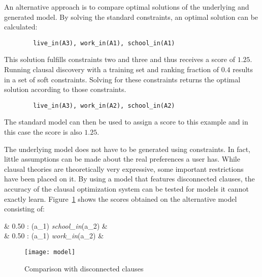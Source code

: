 \begin{experiment}
\label{exp:co_acc_optimal_solution}
	An alternative approach is to compare optimal solutions of the underlying and generated model.
	By solving the standard constraints, an optimal solution can be calculated:
	\begin{verbatim}
		live_in(A3), work_in(A1), school_in(A1)
	\end{verbatim}
	This solution fulfills constraints two and three and thus receives a score of $1.25$.
	Running clausal discovery with a training set and ranking fraction of $0.4$ results in a set of soft constraints.
	Solving for these constraints returns the optimal solution according to those constraints.
	\begin{verbatim}
		live_in(A3), work_in(A2), school_in(A2)
	\end{verbatim}
	The standard model can then be used to assign a score to this example and in this case the score is also $1.25$.
\end{experiment}

\begin{experiment}
	The underlying model does not have to be generated using constraints.
	In fact, little assumptions can be made about the real preferences a user has.
	While clausal theories are theoretically very expressive, some important restrictions have been placed on it.
	By using a model that features disconnected clauses, the accuracy of the clausal optimization system can be tested for models it cannot exactly learn.
	Figure~\ref{fig:co_acc_model} shows the scores obtained on the alternative model consisting of:

	\begin{shiftedflalign*}
		& \text{ }0.50 :  \leftarrow {}(a_1) \land \textit{school\_in}(a_2) & \\
		& \text{ }0.50 :  \leftarrow {}(a_1) \land \textit{work\_in}(a_2) &
	\end{shiftedflalign*}

	\begin{figure}

		\caption{Comparison with disconnected clauses}
		\centering
			\texttt{[image: model]}
		\label{fig:co_acc_model}

	\end{figure}


\end{experiment}

